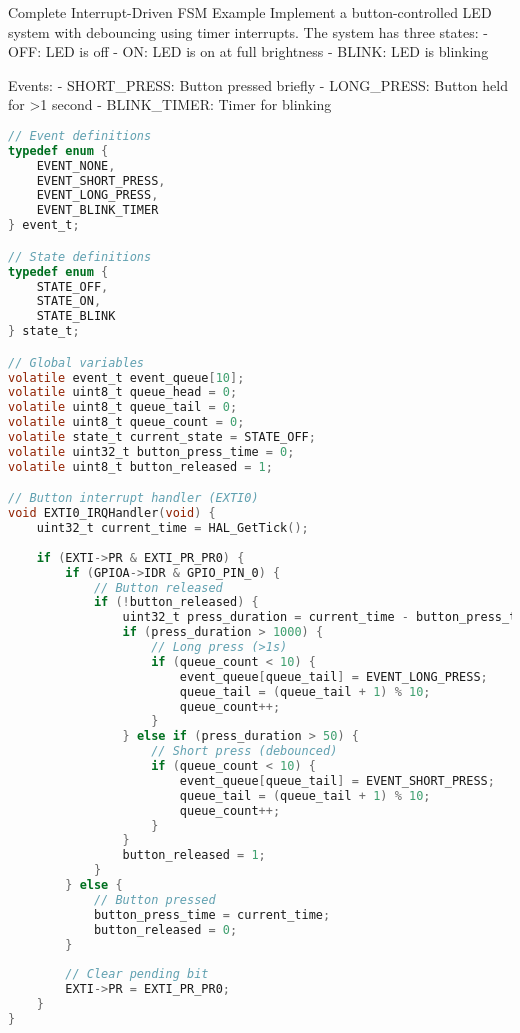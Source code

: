 \begin{example2}{Complete Interrupt-Driven FSM Example}
Implement a button-controlled LED system with debouncing using timer interrupts.
\tcblower
The system has three states:
- OFF: LED is off
- ON: LED is on at full brightness
- BLINK: LED is blinking

Events:
- SHORT\_PRESS: Button pressed briefly
- LONG\_PRESS: Button held for >1 second
- BLINK\_TIMER: Timer for blinking

\begin{lstlisting}[language=C, style=basesmol]
// Event definitions
typedef enum {
    EVENT_NONE,
    EVENT_SHORT_PRESS,
    EVENT_LONG_PRESS,
    EVENT_BLINK_TIMER
} event_t;

// State definitions
typedef enum {
    STATE_OFF,
    STATE_ON,
    STATE_BLINK
} state_t;

// Global variables
volatile event_t event_queue[10];
volatile uint8_t queue_head = 0;
volatile uint8_t queue_tail = 0;
volatile uint8_t queue_count = 0;
volatile state_t current_state = STATE_OFF;
volatile uint32_t button_press_time = 0;
volatile uint8_t button_released = 1;

// Button interrupt handler (EXTI0)
void EXTI0_IRQHandler(void) {
    uint32_t current_time = HAL_GetTick();
    
    if (EXTI->PR & EXTI_PR_PR0) {
        if (GPIOA->IDR & GPIO_PIN_0) {
            // Button released
            if (!button_released) {
                uint32_t press_duration = current_time - button_press_time;
                if (press_duration > 1000) {
                    // Long press (>1s)
                    if (queue_count < 10) {
                        event_queue[queue_tail] = EVENT_LONG_PRESS;
                        queue_tail = (queue_tail + 1) % 10;
                        queue_count++;
                    }
                } else if (press_duration > 50) {
                    // Short press (debounced)
                    if (queue_count < 10) {
                        event_queue[queue_tail] = EVENT_SHORT_PRESS;
                        queue_tail = (queue_tail + 1) % 10;
                        queue_count++;
                    }
                }
                button_released = 1;
            }
        } else {
            // Button pressed
            button_press_time = current_time;
            button_released = 0;
        }
        
        // Clear pending bit
        EXTI->PR = EXTI_PR_PR0;
    }
}
\end{lstlisting}
\end{example2}

